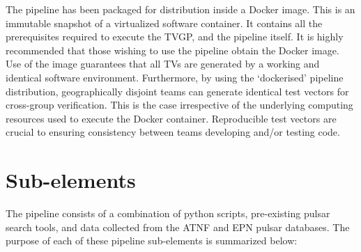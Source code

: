 \documentclass[preprint,authoryear,5p,twocolumn]{elsarticle_mod}
\begin{document}
The pipeline has been packaged for distribution inside a Docker image. This is an immutable snapshot of a virtualized software container. It contains all the prerequisites required to execute the TVGP, and the pipeline itself. It is highly recommended that those wishing to use the pipeline obtain the Docker image. Use of the image guarantees that all TVs are generated by a working and identical software environment. Furthermore, by using the ‘dockerised’ pipeline distribution, geographically disjoint teams can generate identical test vectors for cross-group verification. This is the case irrespective of the underlying computing resources used to execute the Docker container. Reproducible test vectors are crucial to ensuring consistency between teams developing and/or testing code.

\section{Sub-elements}
The pipeline consists of a combination of python scripts, pre-existing pulsar search tools, and data collected from the ATNF and EPN pulsar databases. The purpose of each of these pipeline sub-elements is summarized below: 
\end{document}
